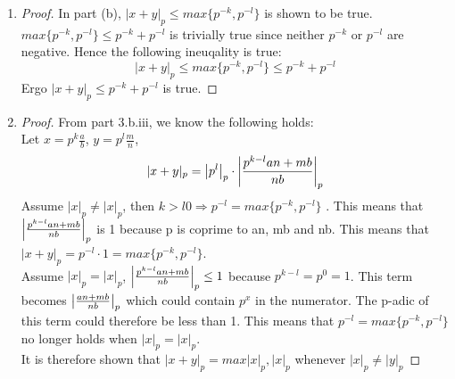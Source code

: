 \documentclass{article}
\DeclarePairedDelimiter\abs{\lvert}{\rvert}
\begin{document}
\begin{enumerate}[label=\textbf{\arabic*}.]
\begin{enumerate}
\begin{enumerate}
					\item  %
						\begin{proof}
							If either x, y = 0:
							$y = 0 \Rightarrow |x|_p=|x|_p$, $x = 0 \Rightarrow |y|_p=|y|_p$.
							This case is trivially proved.
							Let $x = p^k\frac{a}{b}$, $y = p^l\frac{m}{n}$, assume $k\ge l 
							\Rightarrow p^{-l} = max\{p^{-k}, p^{-l}\}$:
							\begin{align*}
								|x+y|_p &= \abs*{p^k\frac{a}{b} + p^l\frac{m}{n}}_p&\\
												&= \abs*{\frac{p^kan + p^lmb}{nb}}_p&\\
												&= \abs*{p^l\frac{p^{k-l}an + mb}{nb}}_p&\\
												&= \abs*{p^l}_p \cdot \abs*{\frac{p^{k-l}an +
													 mb}{nb}}_p&\\
											  &\le p^{-l} \cdot 1 = max\{p^{-k}, p^{-l}\}
							\end{align*}
							Hence shown $|x+y|_p \le max\{p^{-k}, p^{-l}\}$
						\end{proof}
					\end{enumerate}

				\item  %
					\begin{proof}
						In part (b), $|x+y|_p \le max\{p^{-k}, p^{-l}\}$ is shown to be
						true. $max\{p^{-k}, p^{-l}\} \le p^{-k}+p^{-l}$ is trivially true
						since neither $p^{-k}$ or $p^{-l}$ are negative. Hence the following
						ineuqality is true:
						$$|x+y|_p \le max\{p^{-k}, p^{-l}\}\le p^{-k}+p^{-l}$$
						Ergo $|x+y|_p \le p^{-k}+p^{-l}$ is true.
					\end{proof}

				\item  %
					\begin{proof}
						From part 3.b.iii, we know the following holds:\\
						Let $x = p^k\frac{a}{b}$, $y = p^l\frac{m}{n}$,
						$$|x+y|_p = \abs*{p^l}_p \cdot \abs*{\frac{p^{k-l}an + mb}{nb}}_p$$
						Assume $|x|_p \neq |x|_p$, then $k>l0 \Rightarrow p^{-l} =
						max\{p^{-k}, p^{-l}\}$ . This means that
						$\abs*{\frac{p^{k-l}an + mb}{nb}}_p$ is 1 because p is coprime to
						an, mb and nb. This means that $|x+y|_p = p^{-l} \cdot 1 =
						max\{p^{-k}, p^{-l}\}$.\\
						Assume $|x|_p = |x|_p$, $\abs*{\frac{p^{k-l}an + mb}{nb}}_p \le 1$ 
						because $p^{k-l} = p^0 = 1$. This term becomes $\abs*{\frac{an +
						mb}{nb}}_p$ which could contain $p^x$ in the numerator. The p-adic
						of this term could therefore be less than 1. This means that $p^{-l}
						= max\{p^{-k}, p^{-l}\}$ no longer holds when $|x|_p = |x|_p$.\\
						It is therefore shown that $|x+y|_p = max{|x|_p, |x|_p}$ whenever
						$|x|_p \neq |y|_p$
					\end{proof}

			\end{enumerate}
\end{enumerate}
\end{document}
